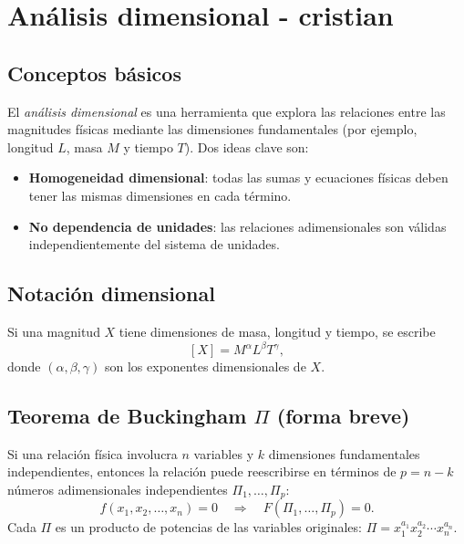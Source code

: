 

\section{Análisis dimensional - cristian}
\label{sec:analisis_dimensional}

\subsection{Conceptos básicos}
El \emph{análisis dimensional} es una herramienta que explora las relaciones entre las magnitudes físicas mediante las dimensiones fundamentales (por ejemplo, longitud $L$, masa $M$ y tiempo $T$). Dos ideas clave son:
\begin{itemize}
  \item \textbf{Homogeneidad dimensional}: todas las sumas y ecuaciones físicas deben tener las mismas dimensiones en cada término.
  \item \textbf{No dependencia de unidades}: las relaciones adimensionales son válidas independientemente del sistema de unidades.
\end{itemize}

\subsection{Notación dimensional}
Si una magnitud $X$ tiene dimensiones de masa, longitud y tiempo, se escribe
\[
[X] = M^{\alpha} L^{\beta} T^{\gamma},
\]
donde $(\alpha,\beta,\gamma)$ son los exponentes dimensionales de $X$.

\subsection{Teorema de Buckingham $\Pi$ (forma breve)}
Si una relación física involucra $n$ variables y $k$ dimensiones fundamentales independientes, entonces la relación puede reescribirse en términos de $p=n-k$ números adimensionales independientes $\Pi_1,\dots,\Pi_p$:
\[
f(x_1,x_2,\dots,x_n)=0 \quad\Longrightarrow\quad F(\Pi_1,\dots,\Pi_p)=0.
\]
Cada $\Pi$ es un producto de potencias de las variables originales: $\Pi = x_1^{a_1}x_2^{a_2}\cdots x_n^{a_n}$.

